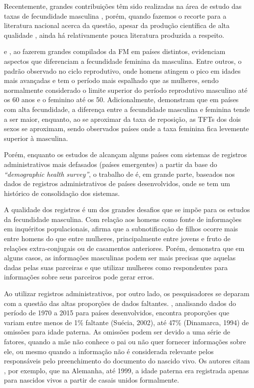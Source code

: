 Recentemente, grandes contribuições têm sido realizadas na área de estudo das taxas de fecundidade masculina \cite{zhang2010male, schoumaker2019male, joyner2012quality, daumler2016men}, porém, quando fazemos o recorte para a literatura nacional acerca da questão, apesar da produção científica de alta qualidade \cite{Wong1986, wong2022fecundidade,falcao_fecundidade_2013}, ainda há relativamente pouca literatura produzida a respeito. 

 e , ao fazerem grandes compilados da FM em países distintos, evidenciam aspectos que diferenciam a fecundidade feminina da masculina. Entre outros, o padrão observado no ciclo reprodutivo, onde homens atingem o pico em idades mais avançadas e tem o período mais espalhado que as mulheres, sendo normalmente considerado o limite superior do período reprodutivo masculino até os 60 anos e o feminino até os 50. Adicionalmente, demonstram que em países com alta fecundidade, a diferença entre a fecundidade masculina e feminina tende a ser maior, enquanto, ao se aproximar da taxa de reposição, as TFTs dos dois sexos se aproximam, sendo observados países onde a taxa feminina fica levemente superior à masculina.

Porém, enquanto os estudos de  alcançam alguns países com sistemas de registros administrativos mais defasados (países emergentes) a partir da base do \textit{“demographic health survey”}, o trabalho de  é, em grande parte, baseados nos dados de registros administrativos de países desenvolvidos, onde se tem um histórico de consolidação dos sistemas. 

A qualidade dos registros é um dos grandes desafios que se impõe para os estudos da fecundidade masculina. Com relação aos homens como fonte de informações em inquéritos populacionais,  afirma que a subnotificação de filhos ocorre mais entre homens do que entre mulheres, principalmente entre jovens e fruto de relações extra-conjugais ou de casamentos anteriores. Porém, demonstra que em alguns casos, as informações masculinas podem ser mais precisas que aquelas dadas pelas suas parceiras e que utilizar mulheres como respondentes para informações sobre seus parceiros pode gerar erros. 

Ao utilizar registros administrativos, por outro lado, os pesquisadores se deparam com a questão das altas proporções de dados faltantes.  
, analisando dados do período de 1970 a 2015 para países desenvolvidos, encontra proporções que variam entre menos de 1\% faltante (Suécia, 2002), até 47\% (Dinamarca, 1994) de omissões para idade paterna. As omissões podem ser devido a uma série de fatores, quando a mãe não conhece o pai ou não quer fornecer informações sobre ele, ou mesmo quando a informação não é considerada relevante pelos responsáveis pelo preenchimento do documento do nascido vivo. Os autores citam \cite{dudel2021male}, por exemplo, que na Alemanha, até 1999, a idade paterna era registrada apenas para nascidos vivos a partir de casais unidos formalmente.



